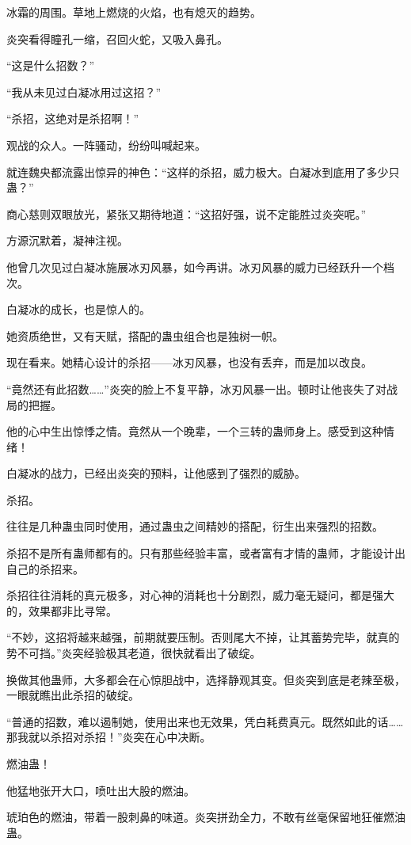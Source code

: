\begin{this_body}
冰霜的周围。草地上燃烧的火焰，也有熄灭的趋势。

炎突看得瞳孔一缩，召回火蛇，又吸入鼻孔。

“这是什么招数？”

“我从未见过白凝冰用过这招？”

“杀招，这绝对是杀招啊！”

观战的众人。一阵骚动，纷纷叫喊起来。

就连魏央都流露出惊异的神色：“这样的杀招，威力极大。白凝冰到底用了多少只蛊？”

商心慈则双眼放光，紧张又期待地道：“这招好强，说不定能胜过炎突呢。”

方源沉默着，凝神注视。

他曾几次见过白凝冰施展冰刃风暴，如今再讲。冰刃风暴的威力已经跃升一个档次。

白凝冰的成长，也是惊人的。

她资质绝世，又有天赋，搭配的蛊虫组合也是独树一帜。

现在看来。她精心设计的杀招——冰刃风暴，也没有丢弃，而是加以改良。

“竟然还有此招数……”炎突的脸上不复平静，冰刃风暴一出。顿时让他丧失了对战局的把握。

他的心中生出惊悸之情。竟然从一个晚辈，一个三转的蛊师身上。感受到这种情绪！

白凝冰的战力，已经出炎突的预料，让他感到了强烈的威胁。

杀招。

往往是几种蛊虫同时使用，通过蛊虫之间精妙的搭配，衍生出来强烈的招数。

杀招不是所有蛊师都有的。只有那些经验丰富，或者富有才情的蛊师，才能设计出自己的杀招来。

杀招往往消耗的真元极多，对心神的消耗也十分剧烈，威力毫无疑问，都是强大的，效果都非比寻常。

“不妙，这招将越来越强，前期就要压制。否则尾大不掉，让其蓄势完毕，就真的势不可挡。”炎突经验极其老道，很快就看出了破绽。

换做其他蛊师，大多都会在心惊胆战中，选择静观其变。但炎突到底是老辣至极，一眼就瞧出此杀招的破绽。

“普通的招数，难以遏制她，使用出来也无效果，凭白耗费真元。既然如此的话……那我就以杀招对杀招！”炎突在心中决断。

燃油蛊！

他猛地张开大口，喷吐出大股的燃油。

琥珀色的燃油，带着一股刺鼻的味道。炎突拼劲全力，不敢有丝毫保留地狂催燃油蛊。


\end{this_body}
